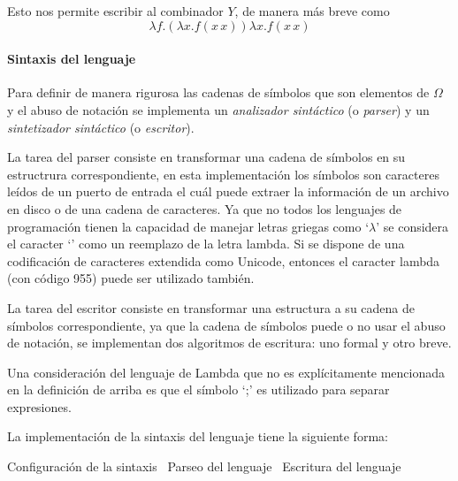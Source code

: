 \documentclass[letterpaper, twoside, openright, 11pt]{book}%
\begin{document}
Esto nos permite escribir al combinador \( Y \), de manera más breve como
\[ λf.(λx.f(x\, x))λx.f(x\, x) \]

\paragraph{Sintaxis del lenguaje} Para definir de manera rigurosa las cadenas de símbolos que son elementos de \( Ω \) y el abuso de notación se implementa un \emph{analizador sintáctico} (o \emph{parser}) y un \emph{sintetizador sintáctico} (o \emph{escritor}).

La tarea del parser consiste en transformar una cadena de símbolos en su estructrura correspondiente, en esta implementación los símbolos son caracteres leídos de un puerto de entrada el cuál puede extraer la información de un archivo en disco o de una cadena de caracteres. Ya que no todos los lenguajes de programación tienen la capacidad de manejar letras griegas como `\( \lambda \)' se considera el caracter `{\Tt{}{\nwbackslash}\nwendquote}' como un reemplazo de la letra lambda. Si se dispone de una codificación de caracteres extendida como {\Tt{}Unicode\nwendquote}, entonces el caracter lambda (con código 955) puede ser utilizado también.

La tarea del escritor consiste en transformar una estructura a su cadena de símbolos correspondiente, ya que la cadena de símbolos puede o no usar el abuso de notación, se implementan dos algoritmos de escritura: uno formal y otro breve.

Una consideración del lenguaje de {\Tt{}Lambda\nwendquote} que no es explícitamente mencionada en la definición de arriba es que el símbolo `{\Tt{};\nwendquote}' es utilizado para separar expresiones.

La implementación de la sintaxis del lenguaje tiene la siguiente forma:

\nwenddocs{}\endmoddef\nwstartdeflinemarkup{}\nwenddeflinemarkup
\LA{}Configuración de la sintaxis~{\nwtagstyle{}}\RA{}
\LA{}Parseo del lenguaje~{\nwtagstyle{}}\RA{}
\LA{}Escritura del lenguaje~{\nwtagstyle{}}\RA{}
\nwendcode{}\nwdocspar
\end{document}
